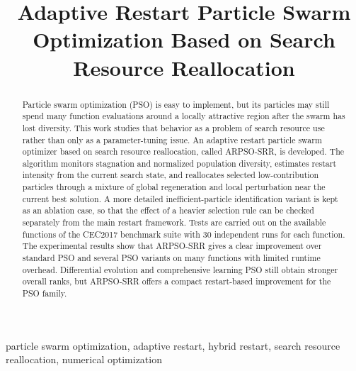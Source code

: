 \documentclass[conference]{IEEEtran}
\begin{document}
\title{Adaptive Restart Particle Swarm Optimization Based on Search Resource Reallocation}

\author{
    \and
}

\maketitle

\begin{abstract}
    Particle swarm optimization (PSO) is easy to implement, but its particles may still spend many function evaluations around a locally attractive region after the swarm has lost diversity. This work studies that behavior as a problem of search resource use rather than only as a parameter-tuning issue. An adaptive restart particle swarm optimizer based on search resource reallocation, called ARPSO-SRR, is developed. The algorithm monitors stagnation and normalized population diversity, estimates restart intensity from the current search state, and reallocates selected low-contribution particles through a mixture of global regeneration and local perturbation near the current best solution. A more detailed inefficient-particle identification variant is kept as an ablation case, so that the effect of a heavier selection rule can be checked separately from the main restart framework. Tests are carried out on the available functions of the CEC2017 benchmark suite with 30 independent runs for each function. The experimental results show that ARPSO-SRR gives a clear improvement over standard PSO and several PSO variants on many functions with limited runtime overhead. Differential evolution and comprehensive learning PSO still obtain stronger overall ranks, but ARPSO-SRR offers a compact restart-based improvement for the PSO family.
\end{abstract}

\begin{IEEEkeywords}
    particle swarm optimization, adaptive restart, hybrid restart, search resource reallocation, numerical optimization
\end{IEEEkeywords}
\end{document}
